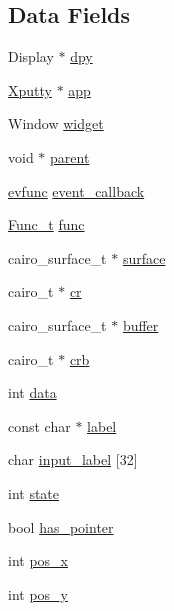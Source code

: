 \subsection*{Data Fields}
\begin{DoxyCompactItemize}
\item 
Display $\ast$ \hyperlink{structWidget__t_a5ae8f0fdd24c6baf15173dc0cc9ae360}{dpy}
\item 
\hyperlink{structXputty}{Xputty} $\ast$ \hyperlink{structWidget__t_a06eaa5b134c47983fd965e745cdbaa3b}{app}
\item 
Window \hyperlink{structWidget__t_acb2bfb41674371ee1220a9d6a2d89fb1}{widget}
\item 
void $\ast$ \hyperlink{structWidget__t_a483f6517c19fe09e1bf2eaec6646a14b}{parent}
\item 
\hyperlink{xwidget_8h_ab4ae973f86a383c8c0f92b709044520a}{evfunc} \hyperlink{structWidget__t_ae458a38ef1448056b22d9b42f795669b}{event\+\_\+callback}
\item 
\hyperlink{structFunc__t}{Func\+\_\+t} \hyperlink{structWidget__t_a225b9a175e132994a5aa73b59a2911ad}{func}
\item 
cairo\+\_\+surface\+\_\+t $\ast$ \hyperlink{structWidget__t_ae9b5979742ea31817ff7d7b34a56f88d}{surface}
\item 
cairo\+\_\+t $\ast$ \hyperlink{structWidget__t_a26594f6ffabe98fc08f9207150fc9417}{cr}
\item 
cairo\+\_\+surface\+\_\+t $\ast$ \hyperlink{structWidget__t_a84d225e7b261d67daa764b47c8c62107}{buffer}
\item 
cairo\+\_\+t $\ast$ \hyperlink{structWidget__t_ad98022ee160d4c0906110868fc9e5664}{crb}
\item 
int \hyperlink{structWidget__t_a9dd7b58be77bf31ab021aa627a73186a}{data}
\item 
const char $\ast$ \hyperlink{structWidget__t_a952020107ac1f6d9a37b4f978f77b61c}{label}
\item 
char \hyperlink{structWidget__t_ac5cb454301472edeb16e563ef2149dbb}{input\+\_\+label} \mbox{[}32\mbox{]}
\item 
int \hyperlink{structWidget__t_aaa935b64805fdeb78acb015c67d6638c}{state}
\item 
bool \hyperlink{structWidget__t_ac8c396c698d816afad49fa751c3ca2c8}{has\+\_\+pointer}
\item 
int \hyperlink{structWidget__t_ae2d46ffb30bb2335a043d138fa05e1a3}{pos\+\_\+x}
\item 
int \hyperlink{structWidget__t_a9b127ac6b3f017b367351ee673e063c3}{pos\+\_\+y}

\end{DoxyCompactItemize}
